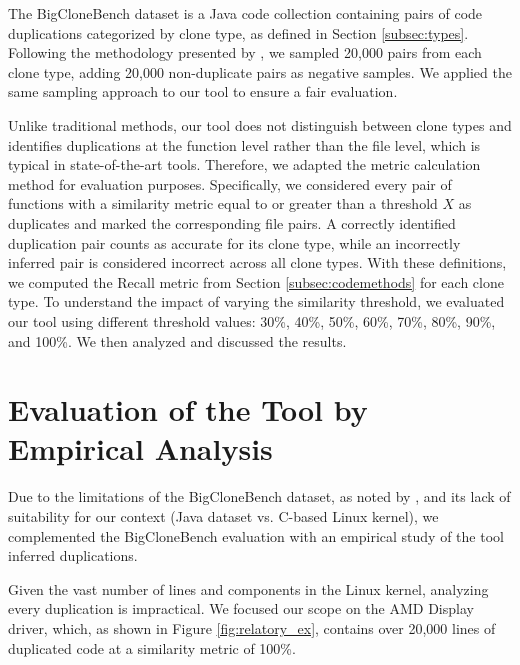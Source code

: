 \label{sec:metbig}

The BigCloneBench dataset \citep{bigclonebench} is a Java code collection containing pairs of code duplications categorized by clone type, as defined in Section \ref{subsec:types}.
%
Following the methodology presented by \citep{tailor}, we sampled 20,000 pairs from each clone type, adding 20,000 non-duplicate pairs as negative samples. We applied the same sampling approach to our tool to ensure a fair evaluation.

Unlike traditional methods, our tool does not distinguish between clone types and identifies duplications at the function level rather than the file level, which is typical in state-of-the-art tools. Therefore, we adapted the metric calculation method for evaluation purposes. Specifically, we considered every pair of functions with a similarity metric equal to or greater than a threshold \(X\) as duplicates and marked the corresponding file pairs. A correctly identified duplication pair counts as accurate for its clone type, while an incorrectly inferred pair is considered incorrect across all clone types. With these definitions, we computed the Recall metric from Section \ref{subsec:codemethods} for each clone type.
%
To understand the impact of varying the similarity threshold, we evaluated our tool using different threshold values: 30\%, 40\%, 50\%, 60\%, 70\%, 80\%, 90\%, and 100\%. We then analyzed and discussed the results.

\section{Evaluation of the Tool by Empirical Analysis}

\label{sec:metemp}


Due to the limitations of the BigCloneBench dataset, as noted by \cite{bigfail}, and its lack of suitability 
for our context (Java dataset vs. C-based Linux kernel), we complemented the BigCloneBench evaluation with 
an empirical study of the tool inferred duplications.

Given the vast number of lines and components in the Linux kernel, analyzing every duplication is impractical. We focused our scope on the AMD Display driver, which, as shown in Figure \ref{fig:relatory_ex}, contains over 20,000 lines of duplicated code at a similarity metric of 100\%.

